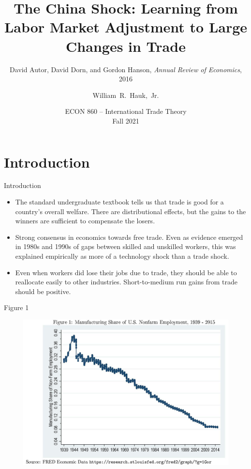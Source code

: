 \documentclass[aspectratio=169]{beamer}
\title[Autor, Dorn, and Hanson (2016)] %
{The China Shock: Learning from Labor Market Adjustment to Large Changes in Trade}
\subtitle{David Autor, David Dorn, and Gordon Hanson, \emph{Annual Review of Economics}, 2016}
\author [Hauk] %
{William~R.~Hauk,~Jr.} %
\institute[UofSC] %
{
  Darla Moore School of Business\\
  University of South Carolina
}
\date[ECON 860, Fall 2021] %
{ECON 860 -- International Trade Theory\\Fall 2021}
\begin{document}
\frame{\titlepage}


\section{Introduction}


\begin{frame}{Introduction}

\begin{itemize}
    \item<1-> The standard undergraduate textbook tells us that trade is good for a country’s overall welfare.  There are distributional effects, but the gains to the winners are sufficient to compensate the losers.
    \item<2-> Strong consensus in economics towards free trade.  Even as evidence emerged in 1980s and 1990s of gaps between skilled and unskilled workers, this was explained empirically as more of a technology shock than a trade shock.
    \item<3-> Even when workers did lose their jobs due to trade, they should be able to reallocate easily to other industries.  Short-to-medium run gains from trade should be positive.
\end{itemize}
    
\end{frame}


\begin{frame}{Figure 1}

\begin{figure}
    \centering
    \includegraphics[scale=0.6]{AutorDornHansonFig1.jpg}
    \label{fig:fig1}
\end{figure}
    
\end{frame}
\end{document}
